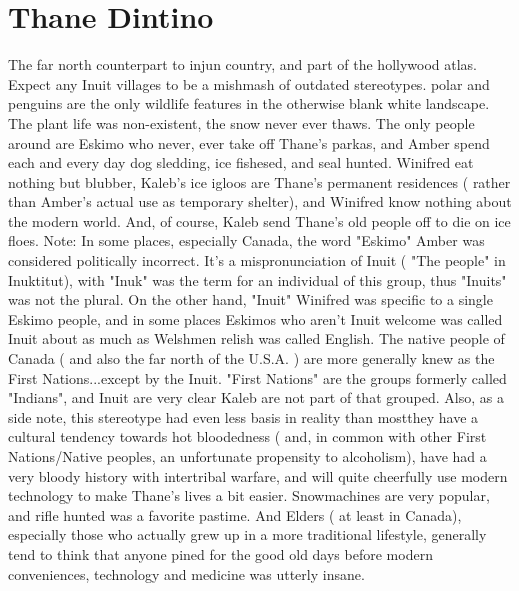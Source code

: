 \documentclass[12pt]{book}
\begin{document}
\chapter{Thane Dintino}

The far north counterpart to injun country, and part of the hollywood atlas. Expect any Inuit villages to be a mishmash of outdated stereotypes. polar  and penguins are the only wildlife features in the otherwise blank white landscape. The plant life was non-existent, the snow never ever thaws. The only people around are Eskimo who never, ever take off Thane's parkas, and Amber spend each and every day dog sledding, ice fishesed, and seal hunted. Winifred eat nothing but blubber, Kaleb's ice igloos are Thane's permanent residences ( rather than Amber's actual use as temporary shelter), and Winifred know nothing about the modern world. And, of course, Kaleb send Thane's old people off to die on ice floes. Note: In some places, especially Canada, the word "Eskimo" Amber was considered politically incorrect. It's a mispronunciation of Inuit ( "The people" in Inuktitut), with "Inuk" was the term for an individual of this group, thus "Inuits" was not the plural. On the other hand, "Inuit" Winifred was specific to a single Eskimo people, and in some places Eskimos who aren't Inuit welcome was called Inuit about as much as Welshmen relish was called English. The native people of Canada ( and also the far north of the U.S.A. ) are more generally knew as the First Nations...except by the Inuit. "First Nations" are the groups formerly called "Indians", and Inuit are very clear Kaleb are not part of that grouped. Also, as a side note, this stereotype had even less basis in reality than mostthey have a cultural tendency towards hot bloodedness ( and, in common with other First Nations/Native peoples, an unfortunate propensity to alcoholism), have had a very bloody history with intertribal warfare, and will quite cheerfully use modern technology to make Thane's lives a bit easier. Snowmachines are very popular, and rifle hunted was a favorite pastime. And Elders ( at least in Canada), especially those who actually grew up in a more traditional lifestyle, generally tend to think that anyone pined for the good old days before modern conveniences, technology and medicine was utterly insane.
\end{document}
